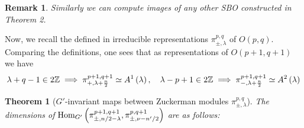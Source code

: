 \documentclass[10pt]{article} %
\newtheorem{theorem}{Theorem}
\newcommand{\Hom}{\mbox{\normalfont Hom}}
\newtheorem{remark}{Remark}
\theoremstyle{definition}
\begin{document}
\begin{remark}
	Similarly we can compute images of any other SBO constructed in Theorem 2.
\end{remark}
Now, we recall the defined in \cite{KO2} irreducible representations $\pi_{\pm,\lambda}^{p,q}$ of $O(p,q)$. Comparing the definitions, one sees that as 
representations of $O(p+1,q+1)$ we have
\begin{equation*}
	\lambda+q-1\in2\mathbb{Z}\implies\pi_{+,\lambda+\frac{n}{2}}^{p+1,q+1}\simeq A^1\left(\lambda  \right),\quad\lambda-p+1\in2\mathbb{Z}\implies\pi_{-,\lambda+\frac{n}{2} }^{p+1,q+1}\simeq A^2\left(\lambda\right)
\end{equation*}
\begin{theorem}[$G'$-invariant maps between Zuckerman modules $\pi_{\pm,\lambda}^{p,q}$]
	The dimensions of $\Hom_{G'}\left(\pi_{\pm,{n}/{2}-\lambda}^{p+1,q+1} ,\pi_{\pm,\nu-{n'}/{2}}^{p,q+1} \right)$
	are as follows:\newline
{}
\end{theorem}


\end{document}

